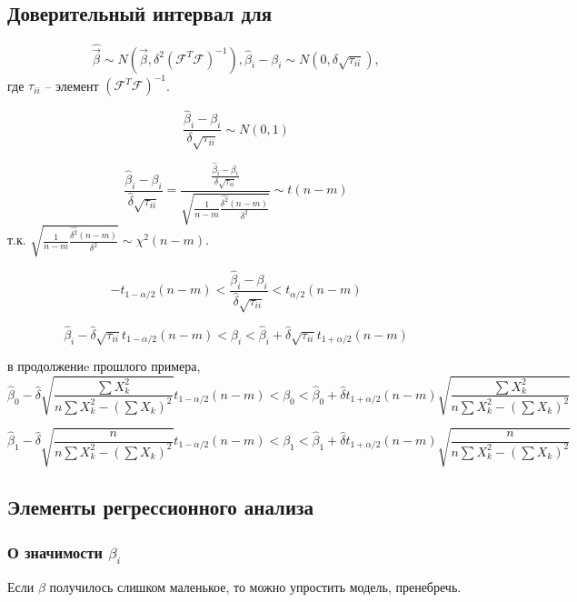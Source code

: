\subsection{Доверительный интервал для \beta}

\[
  \hat{\vec{\beta}} \sim N\left(\vec{\beta}, \delta^2 (\mathcal{F}^T \mathcal{F})^{-1}\right),
  \hat{\beta}_i - \beta_i \sim N(0, \delta \sqrt{\tau_{ii}}),
\]
где $\tau_{ii}$ -- элемент $(\mathcal{F}^T \mathcal{F})^{-1}$.

\[
  \frac{\hat{\beta}_i - \beta_i}{\delta \sqrt{\tau_{ii}}} \sim N(0, 1)
\]

\[ 
  \frac{\hat{\beta}_i - \beta_i}{\hat{\delta} \sqrt{\tau_{ii}}}
  = \frac
  { \frac{\hat{\beta}_i - \beta_i}{\delta \sqrt{\tau_{ii}}} }
  { \sqrt{ \frac{1}{n-m} \frac{\hat{\delta^2} (n-m)}{\delta^2} } }
  \sim t(n-m)
\]
т.к. $ \sqrt{ \frac{1}{n-m} \frac{\hat{\delta^2} (n-m)}{\delta^2} } \sim \chi^2(n-m) $.

\[
  -t_{1-\alpha/2} (n-m) <
  \frac{\hat{\beta}_i - \beta_i}{\hat{\delta} \sqrt{\tau_{ii}}}
  < t_{\alpha/2} (n-m)
\]

\[
  \hat{\beta}_i - \hat{\delta} \sqrt{\tau_{ii}} t_{1-\alpha/2} (n-m) < 
  \beta_i <
  \hat{\beta}_i + \hat{\delta} \sqrt{\tau_{ii}} t_{1 + \alpha/2} (n-m)
\]

\begin{ex}
  в продолжениe прошлого примера,
  \[
    \hat{\beta}_0 - \hat{\delta} \sqrt{ \frac{\sum X_k^2}{n \sum{X_k^2} - \left( \sum X_k \right)^2 } } t_{1-\alpha/2} (n-m) < 
    \beta_0 <
    \hat{\beta}_0 + \hat{\delta} t_{1 + \alpha/2} (n-m) \sqrt{ \frac{\sum X_k^2}{n \sum{X_k^2} - \left( \sum X_k \right)^2 } }
  \]
  
  \[
    \hat{\beta}_1 - \hat{\delta} \sqrt{ \frac{n}{n \sum{X_k^2} - \left( \sum X_k \right)^2 } } t_{1-\alpha/2} (n-m) < 
    \beta_1 <
    \hat{\beta}_1 + \hat{\delta} t_{1 + \alpha/2} (n-m) \sqrt{ \frac{n}{n \sum{X_k^2} - \left( \sum X_k \right)^2 } }
  \]
\end{ex}

\subsection{Элементы регрессионного анализа}

\subsubsection{О значимости $\beta_i$}
Если $\beta$ получилось слишком маленькое, то можно упростить модель, пренебречь.

